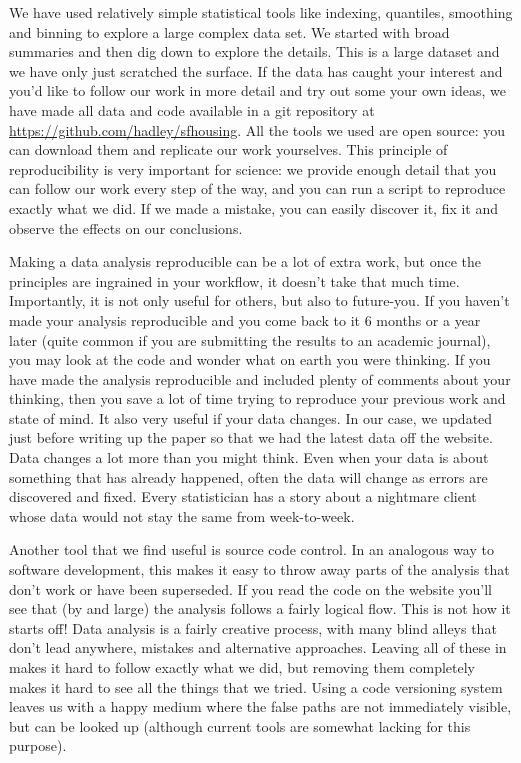 \documentclass[oneside]{article}
\begin{document}
We have used relatively simple statistical tools like indexing, quantiles, smoothing and binning to explore a large complex data set.  We started with broad summaries and then dig down to explore the details.  This is a large dataset and we have only just scratched the surface.  If the data has caught your interest and you'd like to follow our work in more detail and try out some your own ideas, we have made all data and code available in a git repository at \url{https://github.com/hadley/sfhousing}.  All the tools we used are open source: you can download them and replicate our work yourselves. This principle of reproducibility \citep{gentleman:2007} is very important for science: we provide enough detail that you can follow our work every step of the way, and you can run a script to reproduce exactly what we did.  If we made a mistake, you can easily discover it, fix it and observe the effects on our conclusions.  

Making a data analysis reproducible can be a lot of extra work, but once the principles are ingrained in your workflow, it doesn't take that much time.  Importantly, it is not only useful for others, but also to future-you.  If you haven't made your analysis reproducible and you come back to it 6 months or a year later (quite common if you are submitting the results to an academic journal), you may look at the code and wonder what on earth you were thinking.  If you have made the analysis reproducible and included plenty of comments about your thinking, then you save a lot of time trying to reproduce your previous work and state of mind. It also very useful if your data changes.    In our case, we updated just before writing up the paper so that we had the latest data off the website.  Data changes a lot more than you might think.  Even when your data is about something that has already happened, often the data will change  as errors are discovered and fixed.  Every statistician has a story about a nightmare client whose data would not stay the same from week-to-week.

Another tool that we find useful is source code control.  In an analogous way to software development, this makes it easy to throw away parts of the analysis that don't work or have been superseded.  If you read the code on the website you'll see that (by and large) the analysis follows a fairly logical flow.  This is not how it starts off!  Data analysis is a fairly creative process, with many blind alleys that don't lead anywhere, mistakes and alternative approaches.  Leaving all of these in makes it hard to follow exactly what we did, but removing them completely makes it hard to see all the things that we tried.  Using a code versioning system leaves us with a happy medium where the false paths are not immediately visible, but can be looked up (although current tools are somewhat lacking for this purpose).
\end{document}
